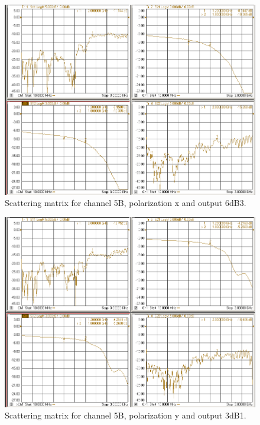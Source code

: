 \documentclass[12pt,a4paper,oneside]{article}
\begin{document}
\begin{figure}[H]
\centering
\includegraphics[width=0.9\linewidth]{VNA_results/5Bx_6dB3.png}
\caption{Scattering matrix for channel 5B, polarization x and output 6dB3.}
\label{fig:5Bx_6dB3}
\end{figure}


\begin{figure}[H]
\centering
\includegraphics[width=0.9\linewidth]{VNA_results/5By_3dB1.png}
\caption{Scattering matrix for channel 5B, polarization y and output 3dB1.}
\label{fig:5By_3dB1}
\end{figure}
\end{document}
